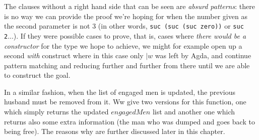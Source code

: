 {The clauses without a right hand side that can be seen are \emph{absurd patterns}: there is no way we can provide the proof we're hoping for when the number given as the second parameter is not 3 (in other words, \texttt{suc (suc (suc zero))} or \texttt{suc 2}...). If they were possible cases to prove, that is, cases where \emph{there would be a constructor} for the type we hope to achieve, we might for example open up a second \emph{with} construct where in this case only $| w$ was left by Agda, and continue pattern matching and reducing further and further from there until we are able to construct the goal.

In a similar fashion, when the list of engaged men is updated, the previous husband must be removed from it. Ww give two versions for this function, one which simply returns the updated $engagedMen$ list and another one which returns also some extra information (the man who was dumped and goes back to being free). The reasons why are further discussed later in this chapter.

}
